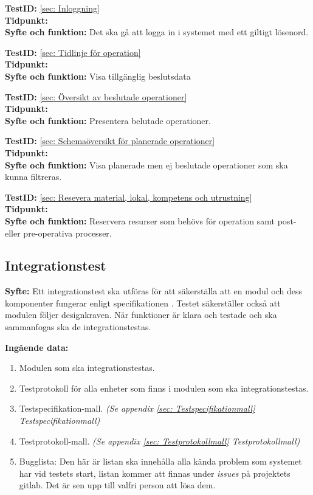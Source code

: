 \documentclass[a4paper,10pt, twoside]{article}
\begin{document}
\textbf{TestID:} \ref{sec: Inloggning}
\\ \textbf{Tidpunkt:}  
\\ \textbf{Syfte och funktion:} Det ska gå att logga in i systemet med ett giltigt lösenord.
  
\textbf{TestID:} \ref{sec: Tidlinje för operation}
\\ \textbf{Tidpunkt:}
\\ \textbf{Syfte och funktion:} Visa tillgänglig beslutsdata

\textbf{TestID:} \ref{sec: Översikt av beslutade operationer}
\\ \textbf{Tidpunkt:}  
\\ \textbf{Syfte och funktion:} Presentera belutade operationer.

\textbf{TestID:} \ref{sec: Schemaöversikt för planerade operationer}
\\ \textbf{Tidpunkt:}  
\\ \textbf{Syfte och funktion:} Visa planerade men ej beslutade operationer som ska kunna filtreras.
  
\textbf{TestID:} \ref{sec: Resevera material, lokal, kompetens och utrustning} 
\\ \textbf{Tidpunkt:}
\\ \textbf{Syfte och funktion:} Reservera resurser som behövs för operation samt post- eller pre-operativa processer.

\subsection{Integrationstest}
\label{sec:Integrationstest}
\textbf{Syfte:} Ett integrationstest ska utföras för att säkerställa att en modul och dess komponenter fungerar enligt specifikationen \cite{kravspec}. Testet säkerställer också att modulen följer designkraven. När funktioner är klara och testade och ska sammanfogas ska de integrationstestas.

\textbf{Ingående data:}
\begin{enumerate}
	\item Modulen som ska integrationstestas.
    \item Testprotokoll för alla enheter som finns i modulen som ska integrationstestas.
    \item Testspecifikation-mall. \emph{(Se appendix \ref{sec: Testspecifikationmall} {Testspecifikationmall})}
    \item Testprotokoll-mall. \emph{(Se appendix \ref{sec: Testprotokollmall} Testprotokollmall)}
    \item Bugglista: Den här är listan ska innehålla alla kända problem som systemet har vid testets start, listan kommer 			  att finnas under \emph{issues} på projektets gitlab. Det är sen upp till valfri person att lösa dem.
\end{enumerate}
\end{document}
